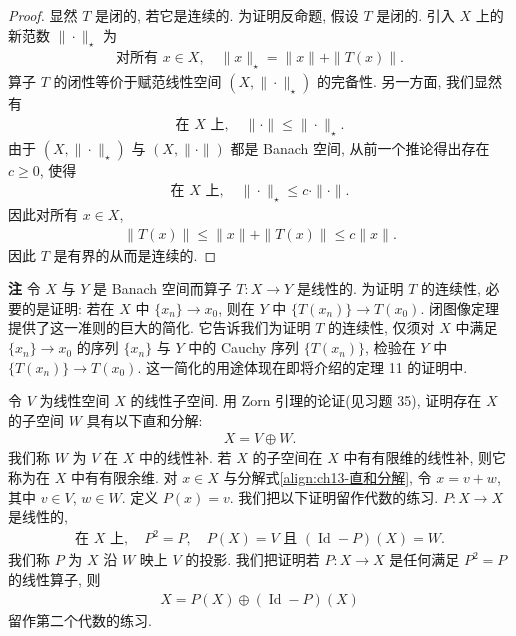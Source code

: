 \documentclass[../../main.tex]{subfiles}
\begin{document}
\begin{proof}
显然 $T$ 是闭的, 若它是连续的. 为证明反命题, 假设 $T$ 是闭的. 引入 $X$ 上的新范数 $\|\cdot\|_{\star}$ 为
\begin{align*}
\text{对所有 }x\in X,\quad\|x\|_{\star}=\|x\|+\|T(x)\|.
\end{align*}
算子 $T$ 的闭性等价于赋范线性空间 $(X,\|\cdot\|_{\star})$ 的完备性. 另一方面, 我们显然有
\begin{align*}
\text{在 }X\text{ 上},\quad\|\cdot\|\leqslant\|\cdot\|_{\star}.
\end{align*}
由于 $(X,\|\cdot\|_{\star})$ 与 $(X,\|\cdot\|)$ 都是 Banach 空间, 从前一个推论得出存在 $c\geqslant 0$, 使得
\begin{align*}
\text{在 }X\text{ 上},\quad\|\cdot\|_{\star}\leqslant c\cdot\|\cdot\|.
\end{align*}
因此对所有 $x\in X$,
\begin{align*}
\|T(x)\|\leqslant\|x\|+\|T(x)\|\leqslant c\|x\|.
\end{align*}
因此 $T$ 是有界的从而是连续的.
\end{proof}

\textbf{注} 令 $X$ 与 $Y$ 是 Banach 空间而算子 $T:X\to Y$ 是线性的. 为证明 $T$ 的连续性, 必要的是证明: 若在 $X$ 中 $\{x_{n}\}\to x_{0}$, 则在 $Y$ 中 $\{T(x_{n})\}\to T(x_{0})$. 闭图像定理提供了这一准则的巨大的简化. 它告诉我们为证明 $T$ 的连续性, 仅须对 $X$ 中满足 $\{x_{n}\}\to x_{0}$ 的序列 $\{x_{n}\}$ 与 $Y$ 中的 Cauchy 序列 $\{T(x_{n})\}$, 检验在 $Y$ 中 $\{T(x_{n})\}\to T(x_{0})$. 这一简化的用途体现在即将介绍的定理 11 的证明中.

令 $V$ 为线性空间 $X$ 的线性子空间. 用 Zorn 引理的论证(见习题 35), 证明存在 $X$ 的子空间 $W$ 具有以下直和分解:
\begin{align}
X=V\oplus W.\label{align:ch13-直和分解}
\end{align}
我们称 $W$ 为 $V$ 在 $X$ 中的线性补. 若 $X$ 的子空间在 $X$ 中有有限维的线性补, 则它称为在 $X$ 中有有限余维. 对 $x\in X$ 与分解式\eqref{align:ch13-直和分解}, 令 $x=v+w$, 其中 $v\in V$, $w\in W$. 定义 $P(x)=v$. 我们把以下证明留作代数的练习. $P:X\to X$ 是线性的,
\begin{align}
\text{在 }X\text{ 上},\quad P^{2}=P,\quad P(X)=V\text{ 且 }(\operatorname{Id}-P)(X)=W.\label{align:ch13-投影性质}
\end{align}
我们称 $P$ 为 $X$ 沿 $W$ 映上 $V$ 的投影. 我们把证明若 $P:X\to X$ 是任何满足 $P^{2}=P$ 的线性算子, 则
\begin{align}
X=P(X)\oplus(\operatorname{Id}-P)(X)\label{align:ch13-投影分解}
\end{align}
留作第二个代数的练习.
\end{document}

